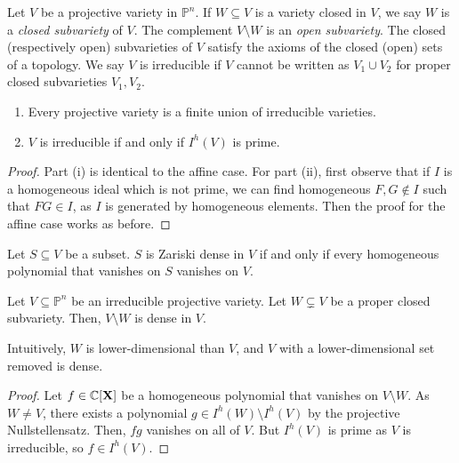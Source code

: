 Let \( V \) be a projective variety in \( \mathbb P^n \).
If \( W \subseteq V \) is a variety closed in \( V \), we say \( W \) is a \emph{closed subvariety} of \( V \).
The complement \( V \setminus W \) is an \emph{open subvariety}.
The closed (respectively open) subvarieties of \( V \) satisfy the axioms of the closed (open) sets of a topology.
We say \( V \) is irreducible if \( V \) cannot be written as \( V_1 \cup V_2 \) for proper closed subvarieties \( V_1, V_2 \).
\begin{proposition}
    \begin{enumerate}
        \item Every projective variety is a finite union of irreducible varieties.
        \item \( V \) is irreducible if and only if \( I^h(V) \) is prime.
    \end{enumerate}
\end{proposition}
\begin{proof}
    Part (i) is identical to the affine case.
    For part (ii), first observe that if \( I \) is a homogeneous ideal which is not prime, we can find homogeneous \( F, G \not\in I \) such that \( FG \in I \), as \( I \) is generated by homogeneous elements.
    Then the proof for the affine case works as before.
\end{proof}
Let \( S \subseteq V \) be a subset.
\( S \) is Zariski dense in \( V \) if and only if every homogeneous polynomial that vanishes on \( S \) vanishes on \( V \).
\begin{proposition}
    Let \( V \subseteq \mathbb P^n \) be an irreducible projective variety.
    Let \( W \subsetneq V \) be a proper closed subvariety.
    Then, \( V \setminus W \) is dense in \( V \).
\end{proposition}
Intuitively, \( W \) is lower-dimensional than \( V \), and \( V \) with a lower-dimensional set removed is dense.
\begin{proof}
    Let \( f \in \mathbb C[\vb X] \) be a homogeneous polynomial that vanishes on \( V \setminus W \).
    As \( W \neq V \), there exists a polynomial \( g \in I^h(W) \setminus I^h(V) \) by the projective Nullstellensatz.
    Then, \( fg \) vanishes on all of \( V \).
    But \( I^h(V) \) is prime as \( V \) is irreducible, so \( f \in I^h(V) \).
\end{proof}

